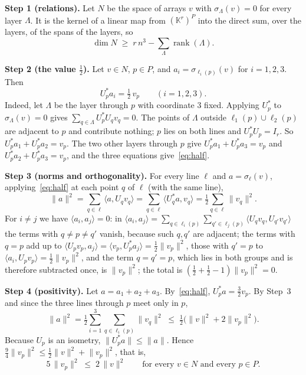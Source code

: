 \documentclass[11pt]{article}
\theoremstyle{remark}
\newcommand{\K}{\mathbb{K}}
\newcommand{\ip}[2]{\langle #1,#2\rangle}
\newcommand{\norm}[1]{\lVert #1\rVert}
\newcommand{\rank}{\operatorname{rank}}
\begin{document}
\smallskip\noindent\textbf{Step 1 (relations).} Let $N$ be the space of arrays $v$ with $\sigma_\Lambda(v)=0$
for every layer $\Lambda$. It is the kernel of a linear map from $(\K^r)^P$ into the direct sum, over the
layers, of the spans of the layers, so
\begin{equation}\label{eq:rn}
\dim N\;\ge\; r\,n^3-\sum_\Lambda\rank(\Lambda).
\end{equation}

\noindent\textbf{Step 2 (the value $\tfrac12$).} Let $v\in N$, $p\in P$, and $a_i=\sigma_{\ell_i(p)}(v)$ for
$i=1,2,3$. Then
\begin{equation}\label{eq:half}
U_p^*a_i=\tfrac12\,v_p\qquad(i=1,2,3).
\end{equation}
Indeed, let $\Lambda$ be the layer through $p$ with coordinate $3$ fixed. Applying $U_p^*$ to
$\sigma_\Lambda(v)=0$ gives $\sum_{q\in\Lambda}U_p^*U_qv_q=0$. The points of $\Lambda$ outside
$\ell_1(p)\cup\ell_2(p)$ are adjacent to $p$ and contribute nothing; $p$ lies on both lines and
$U_p^*U_p=I_r$. So $U_p^*a_1+U_p^*a_2=v_p$. The two other layers through $p$ give
$U_p^*a_1+U_p^*a_3=v_p$ and $U_p^*a_2+U_p^*a_3=v_p$, and the three equations give~\eqref{eq:half}.

\smallskip\noindent\textbf{Step 3 (norms and orthogonality).} For every line $\ell$ and $a=\sigma_\ell(v)$,
applying~\eqref{eq:half} at each point $q$ of $\ell$ (with the same line),
\begin{equation}\label{eq:norm}
\norm a^2=\sum_{q\in\ell}\ip{a}{U_qv_q}=\sum_{q\in\ell}\ip{U_q^*a}{v_q}=\tfrac12\sum_{q\in\ell}\norm{v_q}^2 .
\end{equation}
For $i\ne j$ we have $\ip{a_i}{a_j}=0$: in
$\ip{a_i}{a_j}=\sum_{q\in\ell_i(p)}\sum_{q'\in\ell_j(p)}\ip{U_qv_q}{U_{q'}v_{q'}}$ the terms with $q\ne p\ne q'$
vanish, because such $q,q'$ are adjacent; the terms with $q=p$ add up to
$\ip{U_pv_p}{a_j}=\ip{v_p}{U_p^*a_j}=\tfrac12\norm{v_p}^2$, those with $q'=p$ to
$\ip{a_i}{U_pv_p}=\tfrac12\norm{v_p}^2$, and the term $q=q'=p$, which lies in both groups and is therefore subtracted once, is $\norm{v_p}^2$; the
total is $(\tfrac12+\tfrac12-1)\norm{v_p}^2=0$.

\smallskip\noindent\textbf{Step 4 (positivity).} Let $a=a_1+a_2+a_3$. By~\eqref{eq:half},
$U_p^*a=\tfrac32v_p$. By Step~3 and since the three lines through $p$ meet only in $p$,
\[ \norm a^2=\tfrac12\sum_{i=1}^3\sum_{q\in\ell_i(p)}\norm{v_q}^2\;\le\;\tfrac12\bigl(\norm v^2+2\norm{v_p}^2\bigr). \]
Because $U_p$ is an isometry, $\norm{U_p^*a}\le\norm a$. Hence
$\tfrac94\norm{v_p}^2\le\tfrac12\norm v^2+\norm{v_p}^2$, that is,
\begin{equation}\label{eq:pb}
5\,\norm{v_p}^2\;\le\;2\,\norm v^2\qquad\text{for every }v\in N\text{ and every }p\in P .
\end{equation}
\end{document}
